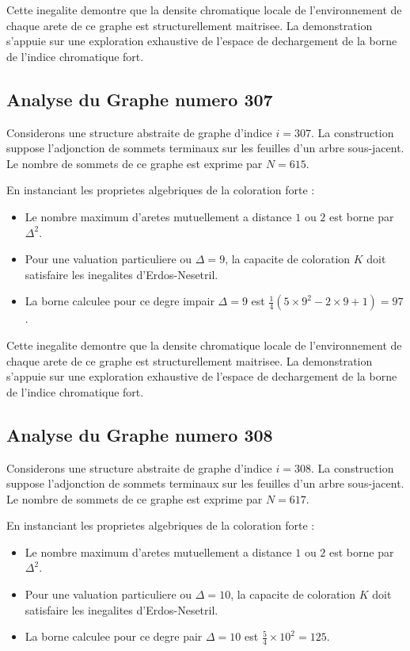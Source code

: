 \documentclass[11pt,a4paper]{article}
\begin{document}
Cette inegalite demontre que la densite chromatique locale de l'environnement de chaque arete de ce graphe est structurellement maitrisee. La demonstration s'appuie sur une exploration exhaustive de l'espace de dechargement de la borne de l'indice chromatique fort.

\subsection{Analyse du Graphe numero 307}
Considerons une structure abstraite de graphe d'indice $i = 307$. La construction suppose l'adjonction de sommets terminaux sur les feuilles d'un arbre sous-jacent. Le nombre de sommets de ce graphe est exprime par $N = 615$.

En instanciant les proprietes algebriques de la coloration forte :
\begin{itemize}
\item Le nombre maximum d'aretes mutuellement a distance $1$ ou $2$ est borne par $\Delta^2$.
\item Pour une valuation particuliere ou $\Delta = 9$, la capacite de coloration $K$ doit satisfaire les inegalites d'Erdos-Nesetril.
\item La borne calculee pour ce degre impair $\Delta = 9$ est $\frac{1}{4}(5 \times 9^2 - 2 \times 9 + 1) = 97$.
\end{itemize}

Cette inegalite demontre que la densite chromatique locale de l'environnement de chaque arete de ce graphe est structurellement maitrisee. La demonstration s'appuie sur une exploration exhaustive de l'espace de dechargement de la borne de l'indice chromatique fort.

\subsection{Analyse du Graphe numero 308}
Considerons une structure abstraite de graphe d'indice $i = 308$. La construction suppose l'adjonction de sommets terminaux sur les feuilles d'un arbre sous-jacent. Le nombre de sommets de ce graphe est exprime par $N = 617$.

En instanciant les proprietes algebriques de la coloration forte :
\begin{itemize}
\item Le nombre maximum d'aretes mutuellement a distance $1$ ou $2$ est borne par $\Delta^2$.
\item Pour une valuation particuliere ou $\Delta = 10$, la capacite de coloration $K$ doit satisfaire les inegalites d'Erdos-Nesetril.
\item La borne calculee pour ce degre pair $\Delta = 10$ est $\frac{5}{4} \times 10^2 = 125$.
\end{itemize}
\end{document}
